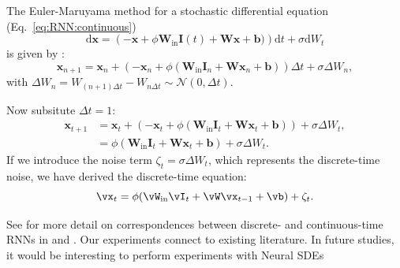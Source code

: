\documentclass{article} %
\newcounter{ct}
\newcommand{\win}{\vW_{\text{in}}}
\newcommand{\wout}{\vW_{\text{out}}}
\newcommand{\bout}{\vb_{\text{out}}}
\theoremstyle{definition}
\theoremstyle{remark}
\begin{document}
The Euler-Maruyama method for a stochastic differential equation (Eq.~\ref{eq:RNN:continuous})
\[\mathrm{d}{\mathbf{x}} = \left(-\mathbf{x} + \phi\mathbf{W}_{\text{in}} \mathbf{I}(t) + \mathbf{W} \mathbf{x} + \mathbf{b})\right)\mathrm{d}{t} + \sigma\mathrm{d}{W}_{t}\] is given by :
\[\mathbf{x}_{n + 1} = \mathbf{x}_{n} + \left( -\mathbf{x}_{n} + \phi(\mathbf{W}_{\text{in}} \mathbf{I}_{n} + \mathbf{W} \mathbf{x}_{n} + \mathbf{b}) \right) \Delta t + \sigma \Delta W_{n},\]
with \(\Delta W_{n}=W_{(n + 1)\Delta t}-W_{n\Delta t}\sim \mathcal{N}(0,\Delta t).\)

Now subsitute \(\Delta t = 1\):
\begin{align}
 \mathbf{x}_{t + 1} &= \mathbf{x}_{t} + \left( -\mathbf{x}_{t} + \phi(\mathbf{W}_{\text{in}} \mathbf{I}_{t} + \mathbf{W} \mathbf{x}_{t} + \mathbf{b}) \right) + \sigma \Delta W_{t}, \\
 &= \phi(\mathbf{W}_{\text{in}} \mathbf{I}_{t} + \mathbf{W} \mathbf{x}_{t} + \mathbf{b}) + \sigma \Delta W_{t}.
 \end{align}
If we introduce the noise term \(\zeta_{t} = \sigma \Delta W_{t}\), which represents the discrete-time noise, we have derived the discrete-time equation: \[ \vx_{t} = \phi(\win \vI_{t} + \vW \vx_{t - 1} + \vb) + \zeta_{t}. \]

See for more detail on correspondences between discrete- and continuous-time RNNs in \citep{monfared2020transformation} and \citep{ozaki2012time}.
Our experiments connect to existing literature. In future studies, it would be interesting to perform experiments with Neural SDEs \citep{tzen2019neural}


%
\end{document}
